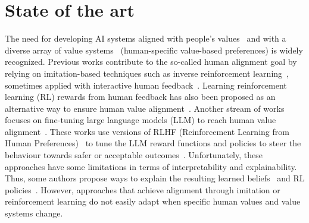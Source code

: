 \documentclass{ecai}
\begin{document}

\section{State of the art}\label{sec:stateofart}

The need for developing AI systems aligned with people's values~\cite{Russell2022alignmentDefinition} and with a diverse array of value systems~\cite{leraleri2024aggregation} (human-specific value-based preferences) is widely recognized. Previous works contribute to the so-called human alignment goal by relying on imitation-based techniques such as inverse reinforcement learning~\cite{hadfieldCIRL,Barnett2023LearningRLTeacher,christiano2023deeprlpreferences}, sometimes applied with interactive human feedback~\cite{Schmidt2020interactiveAI}. Learning reinforcement learning (RL) rewards from human feedback has also been proposed as an alternative way to ensure human value alignment~\cite{Leike2018ScalableAA,leike2020,kaufmann2024survey}. Another stream of works focuses on fine-tuning large language models (LLM) to reach human value alignment~\cite{Watson2024,Praveen2024}. These works use versions of RLHF (Reinforcement Learning from Human Preferences)~\cite{dpoLLM2023,Song2024PROLLM} to tune the LLM reward functions and policies to steer the behaviour towards safer or acceptable outcomes~\cite{Dong2023AlternativeToRLHF,Dai2024}. Unfortunately, these approaches have some  limitations in terms of interpretability and explainability. Thus, some authors propose ways to explain the resulting learned beliefs~\cite{Sanneman2023TransparentVA} and RL policies~\cite{Veronese2023,Veronese2024}. However, approaches that achieve alignment through imitation or reinforcement learning do not easily adapt when specific human values and value systems change. 
\end{document}
